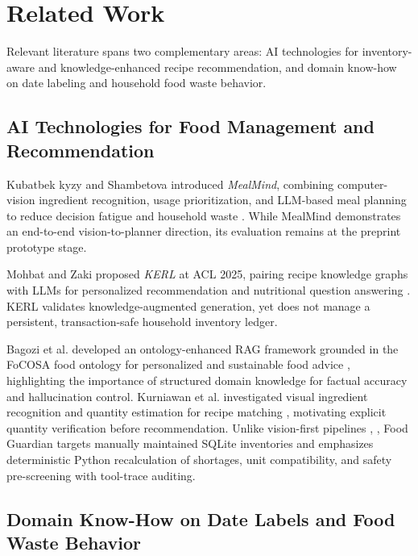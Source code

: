 \section{Related Work}
\label{sec:related_work}

Relevant literature spans two complementary areas: AI technologies for inventory-aware and knowledge-enhanced recipe recommendation, and domain know-how on date labeling and household food waste behavior.

\subsection{AI Technologies for Food Management and Recommendation}

Kubatbek kyzy and Shambetova introduced \textit{MealMind}, combining computer-vision ingredient recognition, usage prioritization, and LLM-based meal planning to reduce decision fatigue and household waste \cite{ref3}. While MealMind demonstrates an end-to-end vision-to-planner direction, its evaluation remains at the preprint prototype stage.

Mohbat and Zaki proposed \textit{KERL} at ACL 2025, pairing recipe knowledge graphs with LLMs for personalized recommendation and nutritional question answering \cite{ref4}. KERL validates knowledge-augmented generation, yet does not manage a persistent, transaction-safe household inventory ledger.

Bagozi et al. developed an ontology-enhanced RAG framework grounded in the FoCOSA food ontology for personalized and sustainable food advice \cite{ref5}, highlighting the importance of structured domain knowledge for factual accuracy and hallucination control. Kurniawan et al. investigated visual ingredient recognition and quantity estimation for recipe matching \cite{ref6}, motivating explicit quantity verification before recommendation. Unlike vision-first pipelines \cite{ref3}, \cite{ref6}, Food Guardian targets manually maintained SQLite inventories and emphasizes deterministic Python recalculation of shortages, unit compatibility, and safety pre-screening with tool-trace auditing.

\subsection{Domain Know-How on Date Labels and Food Waste Behavior}

